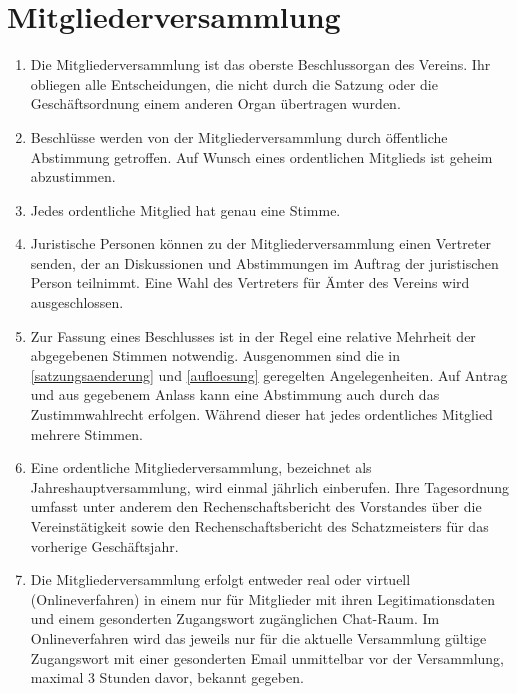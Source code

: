 \documentclass[fontsize=12pt,paper=a4,pagesize,headings=small]{scrartcl}
\begin{document}
\section{Mitgliederversammlung}

\begin{enumerate}
    \item Die Mitgliederversammlung ist das oberste Beschlussorgan des
    Vereins. Ihr obliegen alle Entscheidungen, die nicht durch die
    Satzung oder die Geschäftsordnung einem anderen Organ übertragen
    wurden.

    \item Beschlüsse werden von der Mitgliederversammlung durch
    öffentliche Abstimmung getroffen. Auf Wunsch eines ordentlichen
    Mitglieds ist geheim abzustimmen.

    \item Jedes ordentliche Mitglied hat genau eine Stimme.

    \item Juristische Personen können zu der Mitgliederversammlung
    einen Vertreter senden, der an Diskussionen und Abstimmungen im
    Auftrag der juristischen Person teilnimmt. Eine Wahl des Vertreters
    für Ämter des Vereins wird ausgeschlossen.

    \item Zur Fassung eines Beschlusses ist in der Regel eine relative
    Mehrheit der abgegebenen Stimmen notwendig. Ausgenommen sind die in
    \ref{satzungsaenderung} und \ref{aufloesung} geregelten
    Angelegenheiten. Auf Antrag und aus gegebenem Anlass kann eine
    Abstimmung auch durch das Zustimmwahlrecht erfolgen. Während dieser
    hat jedes ordentliches Mitglied mehrere Stimmen.

    \item Eine ordentliche Mitgliederversammlung, bezeichnet als
    Jahreshauptversammlung, wird einmal jährlich einberufen. Ihre
    Tagesordnung umfasst unter anderem den Rechenschaftsbericht des
    Vorstandes über die Vereinstätigkeit sowie den Rechenschaftsbericht
    des Schatzmeisters für das vorherige Geschäftsjahr.

    \item Die Mitgliederversammlung erfolgt entweder real oder virtuell
    (Onlineverfahren) in einem nur für Mitglieder mit ihren
    Legitimationsdaten und einem gesonderten Zugangswort zugänglichen
    Chat-Raum.
    Im Onlineverfahren wird das jeweils nur für die aktuelle Versammlung
    gültige Zugangswort mit einer gesonderten Email unmittelbar vor der
    Versammlung, maximal 3 Stunden davor, bekannt gegeben.


\end{enumerate}
\end{document}
